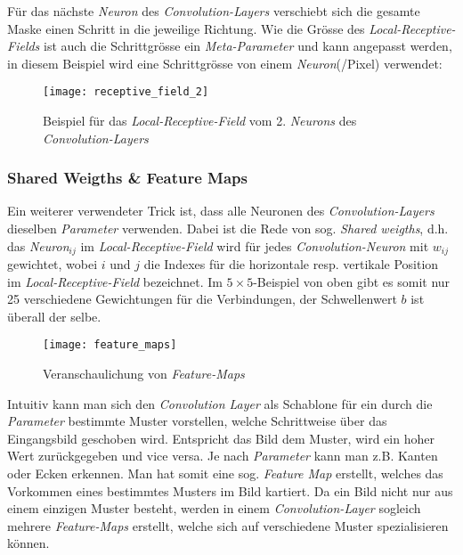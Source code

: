 Für das nächste \textit{Neuron} des \textit{Convolution-Layers} verschiebt sich die gesamte Maske einen Schritt in die jeweilige Richtung. Wie die Grösse des \textit{Local-Receptive-Fields} ist auch die Schrittgrösse ein \textit{Meta-Parameter} und kann angepasst werden, in diesem Beispiel wird eine Schrittgrösse von einem \textit{Neuron}(/Pixel) verwendet:

\begin{figure}[h]
	\ContinuedFloat
	\centering
	\texttt{[image: receptive\_field\_2]}
	\caption[Beispiel für das \textit{Local-Receptive-Field} 2. \textit{Neuron}]{Beispiel für das \textit{Local-Receptive-Field} vom 2. \textit{Neurons} des \textit{Convolution-Layers}}
	\label{img:rec_field2}
\end{figure}

\subsubsection{Shared Weigths \& Feature Maps}
Ein weiterer verwendeter Trick ist, dass alle Neuronen des \textit{Convolution-Layers} dieselben \textit{Parameter} verwenden. Dabei ist die Rede von sog. \textit{Shared weigths}, d.h. das \textit{Neuron}$_{ij}$ im \textit{Local-Receptive-Field} wird für jedes \textit{Convolution-Neuron} mit $w_{ij}$ gewichtet, wobei $i$ und $j$ die Indexes für die horizontale resp. vertikale Position im \textit{Local-Receptive-Field} bezeichnet. Im $5\times 5$-Beispiel von oben gibt es somit nur 25 verschiedene Gewichtungen für die Verbindungen, der Schwellenwert $b$ ist überall der selbe.

\begin{figure}[h]
	\centering
	\texttt{[image: feature\_maps]}
	\caption[\textit{Feature-Maps}]{Veranschaulichung von \textit{Feature-Maps}}
	\label{img:feature_maps}
\end{figure}

Intuitiv kann man sich den \textit{Convolution Layer} als Schablone für ein durch die \textit{Parameter} bestimmte Muster vorstellen, welche Schrittweise über das Eingangsbild geschoben wird. Entspricht das Bild dem Muster, wird ein hoher Wert zurückgegeben und vice versa. Je nach \textit{Parameter} kann man z.B. Kanten oder Ecken erkennen. Man hat somit eine sog. \textit{Feature Map} erstellt, welches das Vorkommen eines bestimmtes Musters im Bild kartiert. Da ein Bild nicht nur aus einem einzigen Muster besteht, werden in einem \textit{Convolution-Layer} sogleich mehrere \textit{Feature-Maps} erstellt, welche sich auf verschiedene Muster spezialisieren können.

